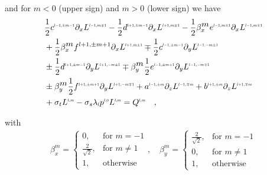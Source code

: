 and for $m<0$ (upper sign) and $m>0$ (lower sign) we have
\begin{align}
&
\frac{1}{2}c^{\scaleto{l-1,\pm m-1}{4pt}}\partial_x L^{\scaleto{l-1,m\mp 1}{4pt}}
-\frac{1}{2}d^{\scaleto{l+1,\pm m-1}{4pt}}\partial_x L^{\scaleto{l+1,m\mp 1}{4pt}}
-\frac{1}{2}\beta_x^{\scaleto{m}{4pt}}e^{\scaleto{l-1,m\pm 1}{4pt}}\partial_x L^{\scaleto{l-1,m\pm 1}{4pt}}
\nonumber
\\&
+\frac{1}{2}\beta_x^{\scaleto{m}{4pt}}f^{l+1,\pm m+1}\partial_x L^{\scaleto{l+1,m\pm 1}{4pt}}
\mp \frac{1}{2}c^{\scaleto{l-1,\pm m-1}{4pt}}\partial_y L^{\scaleto{l-1,-m\pm 1}{4pt}}
\nonumber
\\&
\pm \frac{1}{2}d^{\scaleto{l+1,\pm m-1}{4pt}}\partial_y L^{\scaleto{l+1,-m \pm 1}{4pt}}
\mp \beta_y^{\scaleto{m}{4pt}}\frac{1}{2}e^{\scaleto{l-1,\pm m+1}{4pt}}\partial_y L^{\scaleto{l-1,-m\mp 1}{4pt}}
\nonumber
\\&
\pm \beta_y^{\scaleto{m}{4pt}}\frac{1}{2}f^{\scaleto{l+1,\pm m+1}{4pt}}\partial_y L^{\scaleto{l+1,-m\mp 1}{4pt}}
+a^{\scaleto{l-1,\pm m}{4pt}}\partial_z L^{\scaleto{l-1,\mp m}{4pt}}
+b^{\scaleto{l+1,\pm m}{4pt}}\partial_z L^{\scaleto{l+1,\mp m}{4pt}}
\nonumber
\\&
+\sigma_t L^{\scaleto{l,m}{4pt}}
-\sigma_s\lambda_{\scaleto{l}{4pt}}p^{\scaleto{l,0}{4pt}}L^{\scaleto{l,m}{4pt}}
= Q^{\scaleto{l,m}{4pt}}
\quad ,
\label{eq:rpn_m_>_z}
\end{align}

with
\begin{align*}
\label{eq:real_sh_basis}
\beta_x^{m}=
\left\{
\begin{array}{ll}
0, & \text{for } m = -1\\
\frac{2}{\sqrt{2}}, & \text{for } m \neq 1\\
1, & \text{otherwise }
\end{array}
\right.
,\quad
\beta_y^{m}=
\left\{
\begin{array}{ll}
\frac{2}{\sqrt{2}}, & \text{for } m = -1\\
0, & \text{for } m \neq 1\\
1, & \text{otherwise }
\end{array}
\right.
\end{align*}

